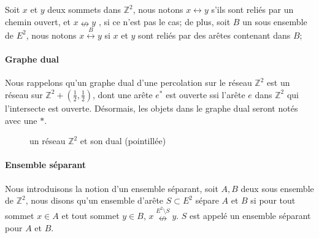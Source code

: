 \documentclass[titlepage,a4paper,12pt]{article}
\begin{document}
Soit $x$ et $y$ deux sommets dans $\mathbb{Z}^2$, nous notons $x\longleftrightarrow y$ s'ils sont reliés par un chemin ouvert, et $x\nleftrightarrow y$ , si ce n'est pas le cas; de plus, soit $B$ un sous ensemble de $E^2$, nous notons $x\overset{B}{\longleftrightarrow} y$ si $x$ et $y$ sont reliés par des arêtes contenant dans $B$;

\paragraph{Graphe dual}Nous rappelons qu'un graphe dual d'une percolation sur le réseau $\mathbb{Z}^2$ est un réseau sur $\mathbb{Z}^2+(\frac{1}{2},\frac{1}{2})$, dont une arête $e^*$ est ouverte ssi l'arête $e$ dans $\mathbb{Z}^2$ qui l'intersecte est ouverte. Désormais, les objets dans le graphe dual seront notés avec une $*$.

\begin{figure}[h]
\center
{}
\caption{un réseau $\mathbb{Z}^2$ et son dual (pointillée)}
\end{figure}

\paragraph{Ensemble séparant}Nous introduisons la notion d'un ensemble séparant, soit $A,B$ deux sous ensemble de $\mathbb{Z}^2$, nous disons qu'un ensemble d'arête $S\subset E^2$ sépare $A$ et $B$ si pour tout sommet $x\in A$ et tout sommet $y\in B$, $x\overset{E^2\setminus S}{\nleftrightarrow} y$. $S$ est appelé un ensemble séparant pour $A$ et $B$.
\end{document}
